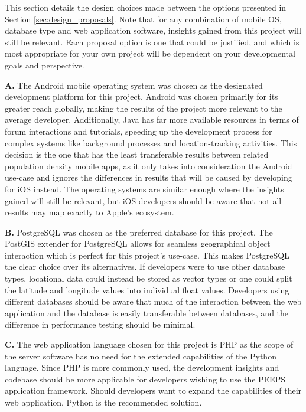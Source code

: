 This section details the design choices made between the options presented in Section \ref{sec:design_proposals}. Note that for any combination of mobile OS, database type and web application software, insights gained from this project will still be relevant. Each proposal option is one that could be justified, and which is most appropriate for your own project will be dependent on your developmental goals and perspective. 

\textbf{A.} The Android mobile operating system was chosen as the designated development platform for this project. Android was chosen primarily for its greater reach globally, making the results of the project more relevant to the average developer. Additionally, Java has far more available resources in terms of forum interactions and tutorials, speeding up the development process for complex systems like background processes and location-tracking activities. This decision is the one that has the least transferable results between related population density mobile apps, as it only takes into consideration the Android use-case and ignores the differences in results that will be caused by developing for iOS instead. The operating systems are similar enough where the insights gained will still be relevant, but iOS developers should be aware that not all results may map exactly to Apple's ecosystem.

\textbf{B.} PostgreSQL was chosen as the preferred database for this project. The PostGIS extender for PostgreSQL allows for seamless geographical object interaction which is perfect for this project's use-case. This makes PostgreSQL the clear choice over its alternatives. If developers were to use other database types, locational data could instead be stored as vector types or one could split the latitude and longitude values into individual float values. Developers using different databases should be aware that much of the interaction between the web application and the database is easily transferable between databases, and the difference in performance testing should be minimal.

\textbf{C.} The web application language chosen for this project is PHP as the scope of the server software has no need for the extended capabilities of the Python language. Since PHP is more commonly used, the development insights and codebase should be more applicable for developers wishing to use the PEEPS application framework. Should developers want to expand the capabilities of their web application, Python is the recommended solution.

